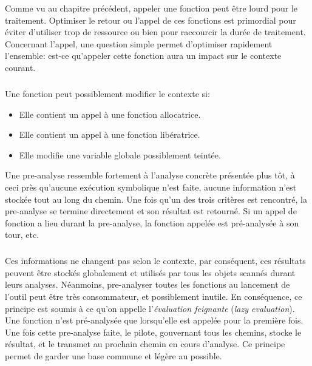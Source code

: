 Comme vu au chapitre précédent, appeler une fonction peut être lourd pour le traitement. Optimiser le retour
ou l'appel de ces fonctions est primordial pour éviter d'utiliser trop de ressource ou bien pour raccourcir la durée de traitement.
Concernant l'appel, une question simple permet d'optimiser rapidement l'ensemble: est-ce qu'appeler cette fonction aura un impact sur le contexte courant.

\subparagraph{}
Une fonction peut possiblement modifier le contexte si:
\begin{itemize}
    \item Elle contient un appel à une fonction allocatrice.
    \item Elle contient un appel à une fonction libératrice.
    \item Elle modifie une variable globale possiblement teintée.
\end{itemize}
Une pre-analyse ressemble fortement à l'analyse concrète présentée plus tôt, à ceci près qu'aucune exécution symbolique n'est faite, aucune information n'est stockée
tout au long du chemin. Une fois qu'un des trois critères est rencontré, la pre-analyse se termine directement et son résultat est retourné.
Si un appel de fonction a lieu durant la pre-analyse, la fonction appelée est pré-analysée à son tour, etc.
\subparagraph{}
Ces informations ne changent pas selon le contexte, par conséquent, ces résultats peuvent être stockés globalement et utilisés par tous les objets scannés
durant leurs analyses. Néanmoins, pre-analyser toutes les fonctions au lancement de l'outil peut être très consommateur, et possiblement inutile. En conséquence,
ce principe est soumis à ce qu'on appelle l'\textit{évaluation feignante} (\textit{lazy evaluation}). Une fonction n'est pré-analysée que lorsqu'elle est appelée pour la première fois.
Une fois cette pre-analyse faite, le pilote, gouvernant tous les chemins, stocke le résultat, et le transmet au prochain chemin en cours d'analyse. Ce principe permet de garder une base
commune et légère au possible.

